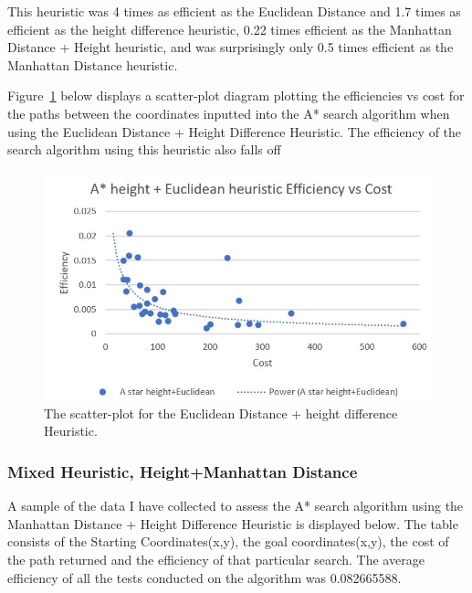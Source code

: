 \documentclass[11pt,oneside]{article}
\begin{document}
This heuristic was 4 times as efficient as the Euclidean Distance and 1.7 times as efficient as the height difference heuristic, 0.22 times efficient as the Manhattan Distance + Height heuristic, and was surprisingly only 0.5 times efficient as the Manhattan Distance heuristic.

Figure~\ref{fig:EDHDEvC} below displays a scatter-plot diagram plotting the efficiencies vs cost for the paths between the coordinates inputted into the A* search algorithm when using the Euclidean Distance + Height Difference Heuristic. The efficiency of the search algorithm using this heuristic also falls off 
\begin{figure}[H]
    \centering
      \includegraphics[scale=0.8]{ED+HD efficiency vs cost.JPG}
      \caption{The scatter-plot for the Euclidean Distance + height difference Heuristic.}
      \label{fig:EDHDEvC}
    \end{figure} 
    
\subsubsection{Mixed Heuristic, Height+Manhattan Distance}
A sample of the data I have collected to assess the A* search algorithm using the Manhattan Distance + Height Difference Heuristic is displayed below. The table consists of the Starting Coordinates(x,y), the goal coordinates(x,y), the cost of the path returned and the efficiency of that particular search. The average efficiency of all the tests conducted on the algorithm was 0.082665588.
\end{document}
